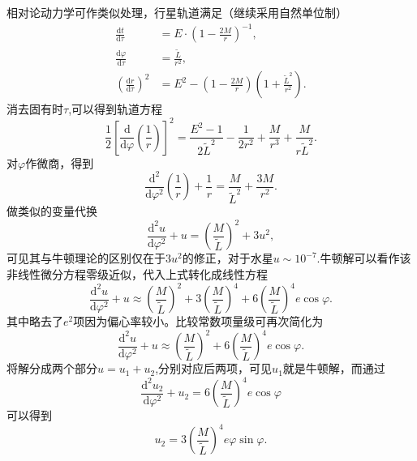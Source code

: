 \documentclass[11pt, a4paper, oneside, onecolumn]{ctexart}
\numberwithin{equation}{subsection}
\begin{document}
相对论动力学可作类似处理，行星轨道满足（继续采用自然单位制）
\begin{align}
\frac{\mathrm{d}t}{\mathrm{d}\tau}&=E\cdot\left(1-\frac{2M}{r}\right)^{-1},\\
\frac{\mathrm{d}\varphi}{\mathrm{d}\tau}&=\frac{\widetilde{L}}{r^{2}},\\
\left(\frac{\mathrm{d}r}{\mathrm{d}\tau}\right)^{2}&=E^{2}-\left(1-\frac{2M}{r}\right)\left(1+\frac{\widetilde{L}^{2}}{r^{2}}\right).
\end{align}
消去固有时$\tau$,可以得到轨道方程
\begin{equation}
\frac{1}{2}\left[\frac{\mathrm{d}}{\mathrm{d}\varphi}\left(\frac{1}{r}\right)\right]^{2}=\frac{E^{2}-1}{2\widetilde{L}^{2}}-\frac{1}{2r^{2}}+\frac{M}{r^{3}}+\frac{M}{r\widetilde{L}^{2}}.
\end{equation}
对$\varphi$作微商，得到
\begin{equation}
\frac{\mathrm{d}^{2}}{\mathrm{d}\varphi^{2}}\left(\frac{1}{r}\right)+\frac{1}{r}=\frac{M}{\widetilde{L}^{2}}+\frac{3M}{r^{2}}.
\end{equation}
做类似的变量代换
\begin{equation}
\frac{\mathrm{d}^{2}u}{\mathrm{d}\varphi^{2}}+u=\left(\frac{M}{\widetilde{L}}\right)^{2}+3u^{2},
\end{equation}
可见其与牛顿理论的区别仅在于$3u^{2}$的修正，对于水星$u\sim10^{-7}$.牛顿解可以看作该非线性微分方程零级近似，代入上式转化成线性方程
\begin{equation}
\frac{\mathrm{d}^{2}u}{\mathrm{d}\varphi^{2}}+u\approx\left(\frac{M}{\widetilde{L}}\right)^{2}+3\left(\frac{M}{\widetilde{L}}\right)^{4}+6\left(\frac{M}{\widetilde{L}}\right)^{4}e\cos\varphi.
\end{equation}
其中略去了$e^{2}$项因为偏心率较小。比较常数项量级可再次简化为
\begin{equation}
\frac{\mathrm{d}^{2}u}{\mathrm{d}\varphi^{2}}+u\approx\left(\frac{M}{\widetilde{L}}\right)^{2}+6\left(\frac{M}{\widetilde{L}}\right)^{4}e\cos\varphi.
\end{equation}
将解分成两个部分$u=u_{1}+u_{2}$,分别对应后两项，可见$u_{1}$就是牛顿解，而通过
\begin{equation}
\frac{\mathrm{d}^{2}u_{2}}{\mathrm{d}\varphi^{2}}+u_{2}=6\left(\frac{M}{\widetilde{L}}\right)^{4}e\cos\varphi
\end{equation}
可以得到
\begin{equation}
u_{2}=3\left(\frac{M}{\widetilde{L}}\right)^{4}e\varphi\sin\varphi.
\end{equation}
\end{document}
